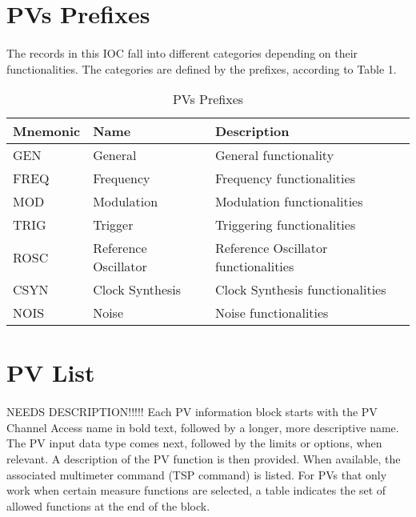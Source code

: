 \documentclass[openany]{article}
\begin{document}
\section{PVs Prefixes}

	\paragraph{} The records in this IOC fall into different categories depending on their functionalities. The categories are defined by the prefixes, according to Table 1.

	\begin{table}[!h]
		\center
		\caption{PVs Prefixes}
		\begin{tabular}{m{3cm} m{3cm} m{7cm}}
			\hline
			\bfseries Mnemonic & \bfseries Name & \bfseries Description \\ \hline
			GEN & General & General functionality \\ \hline
			FREQ & Frequency & Frequency functionalities \\ \hline
			MOD & Modulation & Modulation functionalities \\ \hline
			TRIG & Trigger & Triggering functionalities \\ \hline
			ROSC & Reference Oscillator & Reference Oscillator functionalities \\ \hline
			CSYN & Clock Synthesis & Clock Synthesis functionalities\\ \hline
			NOIS & Noise  & Noise functionalities \\ \hline

		\end{tabular}
	\end{table}

\section{PV List}

		\paragraph{} NEEDS DESCRIPTION!!!!! Each PV information block starts with the PV Channel Access name in bold text, followed by a longer, more descriptive name. The PV input data type comes next, followed by the limits or options, when relevant. A description of the PV function is then provided. When available, the associated multimeter command (TSP command) is listed. For PVs that only work when certain measure functions are selected, a table indicates the set of allowed functions at the end of the block.
\end{document}
